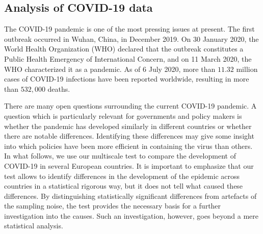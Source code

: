 \documentclass[a4paper,12pt]{article}
\numberwithin{equation}{section}
\begin{document}
\subsection{Analysis of COVID-19 data}\label{subsec:app}


The COVID-19 pandemic is one of the most pressing issues at present. The first outbreak occurred in Wuhan, China, in December 2019. On 30 January 2020, the World Health Organization (WHO) declared that the outbreak constitutes a Public Health Emergency of International Concern, and on 11 March 2020, the WHO characterized it as a pandemic. As of 6 July 2020, more than $11.32$ million cases of COVID-19 infections have been reported worldwide, resulting in more than $532,000$ deaths.

There are many open questions surrounding the current COVID-19 pandemic. A question which is particularly relevant for governments and policy makers is whether the pandemic has developed similarly in different countries or whether there are notable differences. Identifying these differences may give some insight into which policies have been more efficient in containing the virus than others. In what follows, we use our multiscale test to compare the development of COVID-19 in several European countries. It is important to emphasize that our test allows to identify differences in the development of the epidemic across countries in a statistical rigorous way, but it does not tell what caused these differences. By distinguishing statistically significant differences from artefacts of the sampling noise, the test provides the necessary basis for a further investigation into the causes. Such an investigation, however, goes beyond a mere statistical analysis. 



\end{document}
